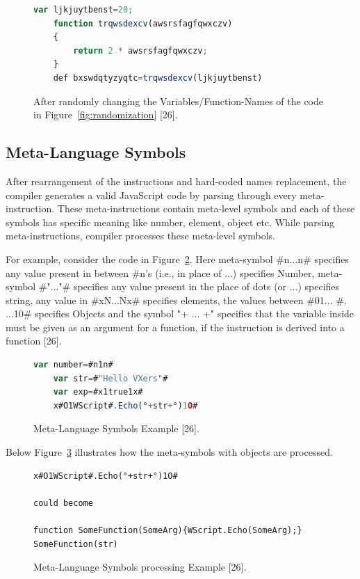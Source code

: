 \begin{figure}
  \centering
  \begin{lstlisting}[language=JavaScript]
	var ljkjuytbenst=20;
	function trqwsdexcv(awsrsfagfqwxczv) 
	{ 
		return 2 * awsrsfagfqwxczv; 
	}
	def bxswdqtyzyqtc=trqwsdexcv(ljkjuytbenst)
\end{lstlisting}
    \caption[After Variable/Function-Name randomization]{After randomly changing the Variables/Function-Names of the code in Figure~\ref{fig:randomization} [26].}
    \label{fig:afterrandomization}
\end{figure}

\subsection{Meta-Language Symbols}

After rearrangement of the instructions and hard-coded names replacement, the compiler generates a valid JavaScript code by parsing through every meta-instruction. These meta-instructions contain meta-level symbols and each of these symbols has specific meaning like number, element, object etc. While parsing meta-instructions, compiler processes these meta-level symbols.

For example, consider the code in Figure~\ref{fig:metalanguage}. Here meta-symbol \#n...n\# specifies any value present in between \#n's (i.e., in place of ...) specifies Number, meta-symbol \#"..."\# specifies any value present in the place of dots (or ...) specifies string, any value in \#xN...Nx\# specifies elements, the values between \#01... \#. ...10\# specifies Objects and the symbol "\textdegree+ ... +\textdegree" specifies that the variable inside must be given as an argument for a function, if the instruction is derived into a function [26].

\begin{figure}
  \centering
  \begin{lstlisting}[language=JavaScript]
	var number=#n1n#					
	var str=#"Hello VXers"#				
	var exp=#x1true1x#					
	x#O1WScript#.Echo(°+str+°)1O#
\end{lstlisting}
    \caption[Meta-Language Symbols Example]{Meta-Language Symbols Example [26].}
    \label{fig:metalanguage}
\end{figure}

Below Figure~\ref{fig:metalanguageprocessing} illustrates how the meta-symbols with objects are processed.

\begin{figure}
  \centering
  \begin{lstlisting}[language=myasm,numbers=none]
x#O1WScript#.Echo(°+str+°)1O# 

could become

function SomeFunction(SomeArg){WScript.Echo(SomeArg);}
SomeFunction(str)
\end{lstlisting}
    \caption[Meta-Language Symbols processing Example]{Meta-Language Symbols processing Example [26].}
    \label{fig:metalanguageprocessing}
\end{figure}

